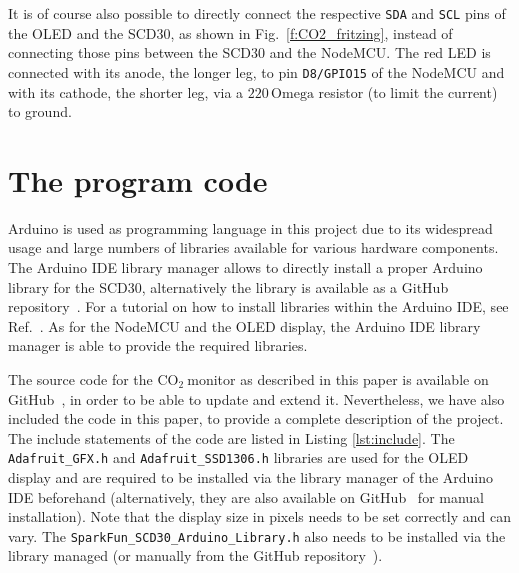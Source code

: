 \documentclass[12pt,a4paper]{article}
\newcommand{\coo}{\ensuremath{\mathrm{CO_2}~}}
\begin{document}
It is of course also possible to directly connect the respective \texttt{SDA} and \texttt{SCL} pins of the OLED and the SCD30, as shown in Fig.~\ref{f:CO2_fritzing}, instead of connecting those pins between the SCD30 and the NodeMCU. The red LED is connected with its anode, the longer leg, to pin \texttt{D8/GPIO15} of the NodeMCU and with its cathode, the shorter leg, via a $220\,\mathrm{Omega}$ resistor (to limit the current) to ground.  




\section{The program code}\label{s:code}
Arduino is used as programming language in this project due to its widespread usage and large numbers of libraries available for various hardware components. The Arduino IDE library manager allows to directly install a proper Arduino library for the SCD30, alternatively the library is available as a GitHub repository~\cite{SPARKFUN2020}. For a tutorial on how to install libraries within the Arduino IDE, see Ref.~\cite{SPARKFUN2020A}.
As for the NodeMCU and the OLED display, the Arduino IDE library manager is able to provide the required libraries.

The source code for the \coo monitor as described in this paper is available on GitHub~\cite{KOEHN2020}, in order to be able to update and extend it. Nevertheless, we have also included the code in this paper, to provide a complete description of the project. The include statements of the code are listed in Listing \ref{lst:include}. The \texttt{Adafruit\_GFX.h} and \texttt{Adafruit\_SSD1306.h} libraries are used for the OLED display and are required to be installed via the library manager of the Arduino IDE beforehand (alternatively, they are also available on GitHub~\cite{ADAFRUIT2020A} for manual installation). Note that the display size in pixels needs to be set correctly and can vary. The \texttt{SparkFun\_SCD30\_Arduino\_Library.h} also needs to be installed via the library managed (or manually from the GitHub repository~\cite{SPARKFUN2020}).
\end{document}
